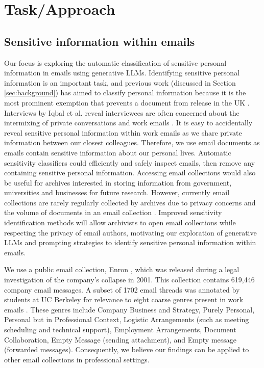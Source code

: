 \section{Task/Approach}
\subsection{Sensitive information within emails}
Our focus is exploring the automatic classification of sensitive personal information in emails using generative LLMs. Identifying sensitive personal information is an important task, and previous work (discussed in Section \ref{sec:background}) has aimed to classify personal information because it is the most prominent exemption that prevents a document from release in the UK \cite{TNA:16}. Interviews by Iqbal et al. reveal interviewees are often concerned about the intermixing of private conversations and work emails \cite{iqbal2021search}. It is easy to accidentally reveal sensitive personal information within work emails as we share private information between our closest colleagues. Therefore, we use email documents as emails contain sensitive information about our personal lives. Automatic sensitivity classifiers could efficiently and safely inspect emails, then remove any containing sensitive personal information. Accessing email collections would also be useful for archives interested in storing information from government, universities and businesses for future research. However, currently email collections are rarely regularly collected by archives due to privacy concerns and the volume of documents in an email collection \cite{TFTAEA:18}. Improved sensitivity identification methods will allow archivists to open email collections while respecting the privacy of email authors, motivating our exploration of generative LLMs and prompting strategies to identify sensitive personal information within emails.

We use a public email collection, Enron \cite{klimt2004enron}, which was released during a legal investigation of the company’s collapse in 2001. This collection contains 619,446 company email messages. A subset of 1702 email threads was annotated by students at UC Berkeley for relevance to eight coarse genres present in work emails \cite{hearst2005teaching}. These genres include Company Business and Strategy, Purely Personal, Personal but in Professional Context, Logistic Arrangements (such as meeting scheduling and technical support), Employment Arrangements, Document Collaboration, Empty Message (sending attachment), and Empty message (forwarded messages). Consequently, we believe our findings can be applied to other email collections in professional settings.

